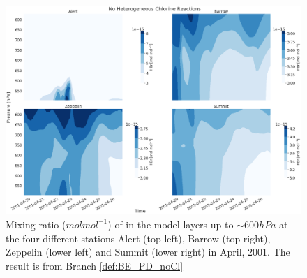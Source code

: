 \begin{figure}[ht]
    \centering
    \includegraphics[width = \linewidth]{Chapter6_Results/images/vertHBr_noCl.png}
    \caption{Mixing ratio ($mol mol^{-1}$) of  in the model layers up to $\sim 600 hPa$ at the four different stations Alert (top left), Barrow (top right), Zeppelin (lower left) and Summit (lower right) in April, 2001. The result is from Branch \ref{def:BE_PD_noCl}}
    \label{fig:vertHBr_noCl}
\end{figure}